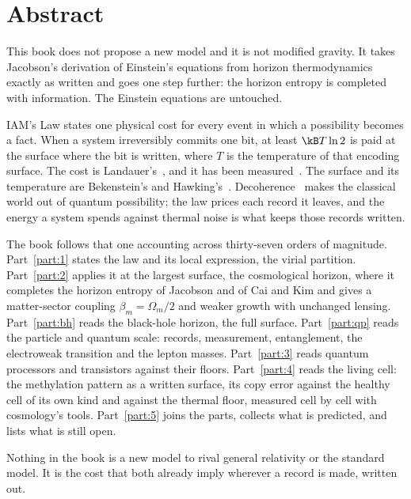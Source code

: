 \chapter*{Abstract}

This book does not propose a new model and it is not modified gravity. It takes Jacobson's derivation of Einstein's equations from horizon
thermodynamics~\cite{Jacobson1995} exactly as written and goes one step further: the horizon entropy is completed with information. The Einstein
equations are untouched. \derived

IAM's Law states one physical cost for every event in which a possibility becomes a fact. When a system
irreversibly commits one bit, at least $\kB T\ln 2$ is paid at the surface where the bit is written, where $T$ is the temperature of that encoding
surface. The cost is Landauer's~\cite{Landauer1961,Bennett1982}, and it has been measured~\cite{Berut2012}. The surface and its temperature are
Bekenstein's and Hawking's~\cite{Bekenstein1973,Hawking1975}. Decoherence~\cite{Zurek2003} makes the classical world out of quantum possibility; the
law prices each record it leaves, and the energy a system spends against thermal noise is what keeps those records written.

The book follows that one accounting across thirty-seven orders of magnitude. Part~\ref{part:1} states the law and its local expression, the virial
partition. Part~\ref{part:2} applies it at the largest surface, the cosmological horizon, where it completes the horizon entropy of Jacobson and of
Cai and Kim and gives a matter-sector coupling $\beta_m=\Omega_m/2$ and weaker growth with unchanged lensing. Part~\ref{part:bh} reads the black-hole
horizon, the full surface. Part~\ref{part:qp} reads the particle and quantum scale: records, measurement, entanglement, the electroweak transition and
the lepton masses. Part~\ref{part:3} reads quantum processors and transistors against their floors. Part~\ref{part:4} reads the living cell: the methylation pattern as a written surface,
its copy error against the healthy cell of its own kind and against the thermal floor, measured cell by cell with cosmology's tools.
Part~\ref{part:5} joins the parts, collects what is predicted, and lists what is still open.

Nothing in the book is a new model to rival general relativity or the standard model. It is the cost that both already imply wherever a record is
made, written out.
